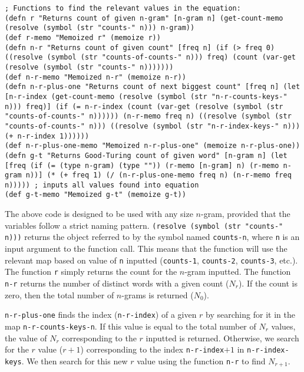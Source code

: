 \begin{lstlisting}
; Functions to find the relevant values in the equation:
(defn r "Returns count of given n-gram" [n-gram n] (get-count-memo (resolve (symbol (str "counts-" n))) n-gram)) 
(def r-memo "Memoized r" (memoize r))
(defn n-r "Returns count of given count" [freq n] (if (> freq 0) ((resolve (symbol (str "counts-of-counts-" n))) freq) (count (var-get (resolve (symbol (str "counts-" n)))))))
(def n-r-memo "Memoized n-r" (memoize n-r))
(defn n-r-plus-one "Returns count of next biggest count" [freq n] (let [n-r-index (get-count-memo (resolve (symbol (str "n-r-counts-keys-" n))) freq)] (if (= n-r-index (count (var-get (resolve (symbol (str "counts-of-counts-" n)))))) (n-r-memo freq n) ((resolve (symbol (str "counts-of-counts-" n))) ((resolve (symbol (str "n-r-index-keys-" n))) (+ n-r-index 1)))))) 
(def n-r-plus-one-memo "Memoized n-r-plus-one" (memoize n-r-plus-one))
(defn g-t "Returns Good-Turing count of given word" [n-gram n] (let [freq (if (= (type n-gram) (type "")) (r-memo [n-gram] n) (r-memo n-gram n))] (* (+ freq 1) (/ (n-r-plus-one-memo freq n) (n-r-memo freq n))))) ; inputs all values found into equation
(def g-t-memo "Memoized g-t" (memoize g-t))
\end{lstlisting}

The above code is designed to be used with any size $n$-gram, provided that the variables follow a strict naming pattern. \lstinline!(resolve (symbol (str "counts-" n)))! returns the object referred to by the symbol named \lstinline!counts-n!, where \lstinline!n! is an input argument to the function call. This means that the function will use the relevant map based on value of \lstinline!n! inputted (\lstinline!counts-1!, \lstinline!counts-2!, \lstinline!counts-3!, etc.). The function \lstinline!r! simply returns the count for the $n$-gram inputted. The function \lstinline!n-r! returns the number of distinct words with a given count ($N_{r}$). If the count is zero, then the total number of $n$-grams is returned ($N_{0}$).

\lstinline!n-r-plus-one! finds the index (\lstinline!n-r-index!) of a given $r$ by searching for it in the map \lstinline!n-r-counts-keys-n!. If this value is equal to the total number of $N_{r}$ values, the value of $N_{r}$ corresponding to the $r$ inputted is returned. Otherwise, we search for the $r$ value ($r+1$) corresponding to the index \lstinline!n-r-index!$+1$ in \lstinline!n-r-index-keys!. We then search for this new $r$ value using the function \lstinline!n-r! to find $N_{r+1}$.

